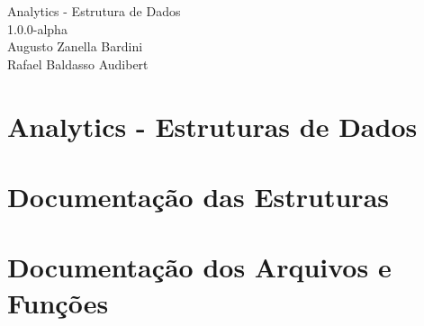 \documentclass[twoside]{book}
\newcommand{\+}{\discretionary{\mbox{\scriptsize$\hookleftarrow$}}{}{}}
\newcommand{\clearemptydoublepage}{%
  \newpage{\pagestyle{empty}\cleardoublepage}%
}
\begin{document}
\hypersetup{pageanchor=false,
             bookmarksnumbered=true,
             pdfencoding=unicode
            }
\begin{titlepage}
\vspace*{7cm}
\begin{center}%
{\Large Analytics -\/ Estrutura de Dados \\[1ex]\large 1.\+0.\+0-\/alpha }\\
\vspace*{1cm}
{\large Augusto Zanella Bardini}\\
{\large Rafael Baldasso Audibert}\\
\end{center}
\end{titlepage}
\clearemptydoublepage
{}
\hypersetup{pageanchor=true}

\chapter{Analytics -\/ Estruturas de Dados}
\label{md__r_e_a_d_m_e}


\chapter{Documentação das Estruturas}





\chapter{Documentação dos Arquivos e Funções}









\end{document}
